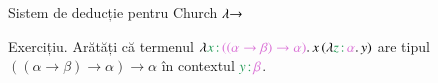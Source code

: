 \documentclass[xcolor=pdftex,romanian,colorlinks]{beamer}
\begin{document}
\begin{frame}{Sistem de deducție pentru Church $\lambda\hspace{-.1cm}\to$}

{\color{True} Exercițiu.} Arătăți că termenul $\abs{\type{x}{((\alpha \to \beta)\to \alpha)}}{\app{x}{({\abs{\type{z}{\alpha}}{y})}}}$ are tipul $((\alpha \to \beta)\to \alpha) \to \alpha$ în contextul $\type{y}{\beta}$.


\end{frame}
%
%
%
%
%
%
%
%
\end{document}
